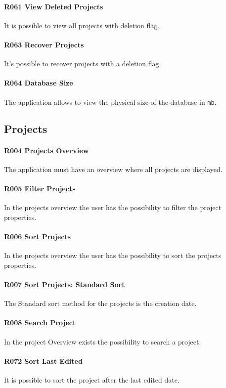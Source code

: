 \paragraph{R061 View Deleted Projects}
It is possible to view all projects with deletion flag.
\paragraph{R063 Recover Projects}
It's possible to recover projects with a deletion flag.
\paragraph{R064 Database Size}
The application allows to view the physical size of the database in \texttt{mb}.

\subsection{Projects}
\paragraph{R004 Projects Overview}
The application must have an overview where all projects are displayed.
\paragraph{R005 Filter Projects}
In the projects overview the user has the possibility to filter the project properties.
\paragraph{R006 Sort Projects}
In the projects overview the user has the possibility to sort the projects properties.
\paragraph{R007 Sort Projects: Standard Sort}
The Standard  sort method for the projects is the creation date.
\paragraph{R008 Search Project}
In the project Overview exists the possibility to search a project.
\paragraph{R072 Sort Last Edited}
It is possible to sort the project after the last edited date.
